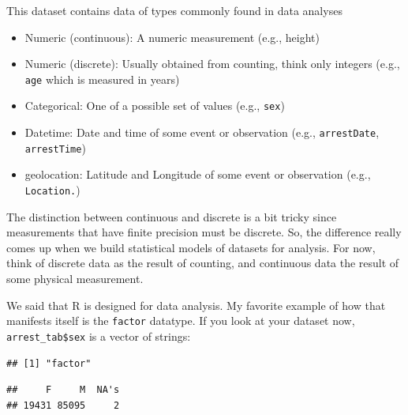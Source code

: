 \documentclass[]{article}
\newenvironment{Shaded}{\begin{snugshade}}{\end{snugshade}}
\newcommand{\KeywordTok}[1]{\textcolor[rgb]{0.13,0.29,0.53}{\textbf{{#1}}}}
\newcommand{\NormalTok}[1]{{#1}}
\theoremstyle{definition}
\theoremstyle{definition}
\theoremstyle{remark}
\begin{document}
This dataset contains data of types commonly found in data analyses

\begin{itemize}
\itemsep1pt\parskip0pt
\item
  Numeric (continuous): A numeric measurement (e.g., height)\\
\item
  Numeric (discrete): Usually obtained from counting, think only
  integers (e.g., \texttt{age} which is measured in years)\\
\item
  Categorical: One of a possible set of values (e.g., \texttt{sex})\\
\item
  Datetime: Date and time of some event or observation (e.g.,
  \texttt{arrestDate}, \texttt{arrestTime})\\
\item
  geolocation: Latitude and Longitude of some event or observation
  (e.g., \texttt{Location.})
\end{itemize}

The distinction between continuous and discrete is a bit tricky since
measurements that have finite precision must be discrete. So, the
difference really comes up when we build statistical models of datasets
for analysis. For now, think of discrete data as the result of counting,
and continuous data the result of some physical measurement.

We said that R is designed for data analysis. My favorite example of how
that manifests itself is the \texttt{factor} datatype. If you look at
your dataset now, \texttt{arrest\_tab\$sex} is a vector of strings:

\begin{Shaded}
\end{Shaded}

\begin{verbatim}
## [1] "factor"
\end{verbatim}

\begin{Shaded}
\end{Shaded}

\begin{verbatim}
##     F     M  NA's 
## 19431 85095     2
\end{verbatim}
\end{document}

